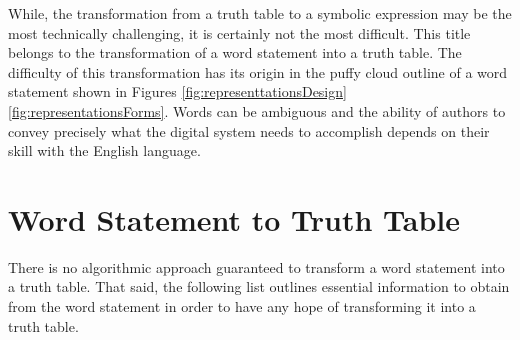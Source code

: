 While, the transformation from a truth table to a symbolic expression
may be the most technically challenging, it is certainly not the
most difficult.  This title belongs to the transformation of a word
statement into a truth table.  The difficulty of this transformation
has its origin in the puffy cloud outline of a word statement shown in
Figures \ref{fig:representtationsDesign} \ref{fig:representationsForms}. Words can be ambiguous and 
the ability of authors to convey precisely what the digital system
needs to accomplish depends on their skill with the English language.

\section{Word Statement to Truth Table}
There is no algorithmic approach guaranteed to transform a word statement 
into a truth table.  That said, the following list outlines essential
information to obtain from the word statement in order to
have any hope of transforming it into a truth table.



